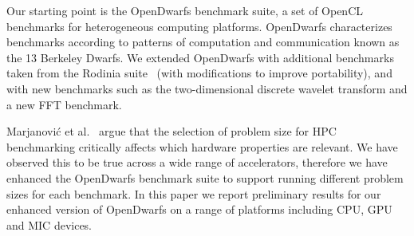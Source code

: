 \documentclass[../document.tex]{subfiles}
\begin{document}
Our starting point is the OpenDwarfs benchmark suite, a set of OpenCL benchmarks for heterogeneous computing platforms.\cite{krommydas2016opendwarfs}
OpenDwarfs characterizes benchmarks according to patterns of computation and communication known as the 13 Berkeley Dwarfs.\cite{asanovic2006landscape}
We extended OpenDwarfs with additional benchmarks taken from the Rodinia suite~\cite{che2009rodinia} (with modifications to improve portability), and with new benchmarks such as the two-dimensional discrete wavelet transform and a new FFT benchmark.

Marjanovi\'{c} et al.~\cite{marjanovic2016hpc} argue that the selection of problem size for HPC benchmarking critically affects which hardware properties are relevant.
We have observed this to be true across a wide range of accelerators, therefore we have enhanced the OpenDwarfs benchmark suite to support running different problem sizes for each benchmark.
In this paper we report preliminary results for our enhanced version of OpenDwarfs on a range of platforms including CPU, GPU and MIC devices.

\end{document}
